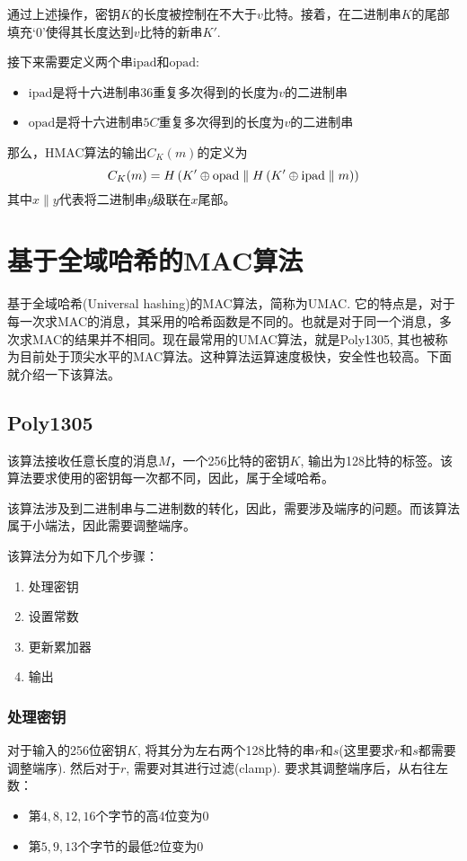 通过上述操作，密钥$K$的长度被控制在不大于$v$比特。接着，在二进制串$K$的尾部填充`0'使得其长度达到$v$比特的新串$K'$.\par
接下来需要定义两个串$\mathrm{ipad}$和$\mathrm{opad}$:
\begin{itemize}
	\item $\mathrm{ipad}$是将十六进制串$36$重复多次得到的长度为$v$的二进制串
	\item $\mathrm{opad}$是将十六进制串$5C$重复多次得到的长度为$v$的二进制串
\end{itemize}

那么，HMAC算法的输出$C_K(m)$的定义为
\begin{equation}
	C_K(m)=H\left( {K'\oplus\mathrm{opad}\parallel H\left( {K'\oplus\mathrm{ipad}\parallel m}\right)}\right)
\end{equation}
其中$x\parallel y$代表将二进制串$y$级联在$x$尾部。
\section{基于全域哈希的MAC算法}
基于全域哈希(Universal hashing)的MAC算法，简称为UMAC. 它的特点是，对于每一次求MAC的消息，其采用的哈希函数是不同的。也就是对于同一个消息，多次求MAC的结果并不相同。现在最常用的UMAC算法，就是Poly1305, 其也被称为目前处于顶尖水平的MAC算法。这种算法运算速度极快，安全性也较高。下面就介绍一下该算法。
\subsection{Poly1305}
该算法接收任意长度的消息$M$，一个256比特的密钥$K$, 输出为128比特的标签。该算法要求使用的密钥每一次都不同，因此，属于全域哈希。\par
该算法涉及到二进制串与二进制数的转化，因此，需要涉及端序的问题。而该算法属于小端法，因此需要调整端序。\par
该算法分为如下几个步骤：
\begin{enumerate}
	\item 处理密钥
	\item 设置常数
	\item 更新累加器
	\item 输出
\end{enumerate}
\subsubsection{处理密钥}
对于输入的256位密钥$K$, 将其分为左右两个128比特的串$r$和$s$(这里要求$r$和$s$都需要调整端序). 然后对于$r$, 需要对其进行过滤(clamp). 要求其调整端序后，从右往左数：
\begin{itemize}
	\item 第$4, 8, 12, 16$个字节的高4位变为0
	\item 第$5, 9, 13$个字节的最低2位变为0
\end{itemize}

